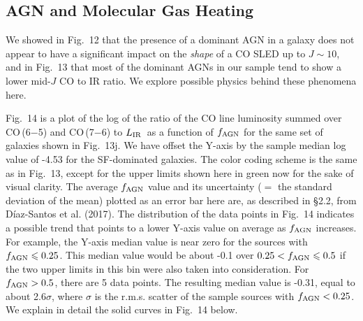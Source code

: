 \documentclass[preprint]{aastex}
\newcommand{\LIR}{\mbox{$L_{\rm IR}$}}
\begin{document}
\subsection{AGN and Molecular Gas Heating} \label{sec5.3}


We showed in Fig.~12 that the presence of a dominant AGN in a galaxy does 
not appear to have a significant impact on the {\it shape} of a CO SLED 
up to $J \sim 10$, and in Fig.~13 that most of the dominant AGNs in our 
sample tend to show a lower mid-$J$ CO to IR ratio. We explore possible 
physics behind these phenomena here.


Fig.~14 is a plot of the log of the ratio of the CO line luminosity summed 
over CO\,(6$-$5) and CO\,(7$-$6) to \LIR\ as a function of $f_{\rm AGN}$ for
the same set of galaxies shown in Fig.~13j. We have offset the Y-axis by 
the sample median log value of -4.53 for the SF-dominated galaxies.  
The color coding scheme is the same as in Fig.~13, except for the upper limits 
shown here in green now for the sake of visual clarity.  
The average $f_{\rm AGN}$ value and its uncertainty ($=$ the standard 
deviation of the mean) plotted as an error bar here are, as described in \S2.2, 
from D\'iaz-Santos et al. (2017).  The distribution of the data points in 
Fig.~14 indicates a possible trend that points to a lower Y-axis value on 
average as $f_{\rm AGN}$ increases.  For example, the Y-axis median value is 
near zero for the sources with $f_{\rm AGN} \leqslant 0.25$.  This median 
value would be about -0.1 over $0.25 <  f_{\rm AGN} \leqslant 0.5$ if 
the two upper limits in this bin were also taken into consideration.  For 
$f_{\rm AGN} > 0.5$, there are 5 data points. The resulting median value 
is -0.31, equal to about 2.6$\sigma$, where $\sigma$ is the r.m.s. scatter 
of the sample sources with $f_{\rm AGN} < 0.25$.  We explain in detail
the solid curves in Fig.~14 below.
\end{document}
